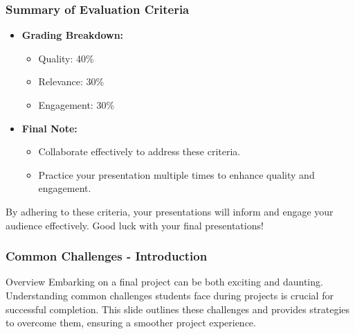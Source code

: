 \documentclass[aspectratio=169]{beamer}
\begin{document}
\begin{frame}[fragile]
    \frametitle{Summary of Evaluation Criteria}
    \begin{itemize}
        \item \textbf{Grading Breakdown:}
        \begin{itemize}
            \item Quality: 40\%
            \item Relevance: 30\%
            \item Engagement: 30\%
        \end{itemize}
        
        \item \textbf{Final Note:}
        \begin{itemize}
            \item Collaborate effectively to address these criteria.
            \item Practice your presentation multiple times to enhance quality and engagement.
        \end{itemize}
    \end{itemize}
    
    By adhering to these criteria, your presentations will inform and engage your audience effectively. Good luck with your final presentations!
\end{frame}

\begin{frame}[fragile]
    \frametitle{Common Challenges - Introduction}
    \begin{block}{Overview}
        Embarking on a final project can be both exciting and daunting. 
        Understanding common challenges students face during projects is crucial for successful completion. 
        This slide outlines these challenges and provides strategies to overcome them, ensuring a smoother project experience.
    \end{block}
\end{frame}
\end{document}
